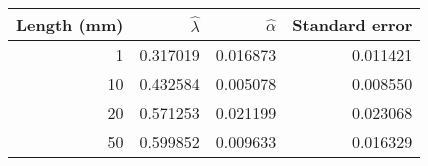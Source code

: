 \begin{tabular}{rrrr}
\toprule
 Length (mm) &  $\hat{\lambda}$ &  $\hat{\alpha}$ &  Standard error \\
\midrule
           1 &         0.317019 &        0.016873 &        0.011421 \\
          10 &         0.432584 &        0.005078 &        0.008550 \\
          20 &         0.571253 &        0.021199 &        0.023068 \\
          50 &         0.599852 &        0.009633 &        0.016329 \\
\bottomrule
\end{tabular}
